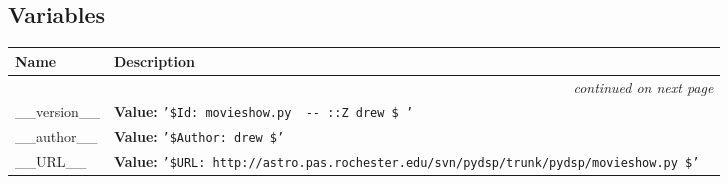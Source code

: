   \subsection{Variables}

\begin{longtable}{|p{}|p{}|l}
\cline{1-2}
\cline{1-2} \centering \textbf{Name} & \centering \textbf{Description}& \\
\cline{1-2}
\endhead\cline{1-2}\multicolumn{3}{r}{\small\textit{continued on next page}}\\\endfoot\cline{1-2}
\endlastfoot\raggedright \_\-\_\-v\-e\-r\-s\-i\-o\-n\-\_\-\_\- & \textbf{Value:} 
{\tt '\-\$\-I\-d\-:\-~\-m\-o\-v\-i\-e\-s\-h\-o\-w\-.\-p\-y\-~\-4\-0\-0\-~\-2\-0\-0\-6\--\-0\-6\--\-1\-9\-~\-2\-2\-:\-3\-9\-:\-3\-0\-Z\-~\-d\-r\-e\-w\-~\-\$\-~\-'\-}&\\
\cline{1-2}
\raggedright \_\-\_\-a\-u\-t\-h\-o\-r\-\_\-\_\- & \textbf{Value:} 
{\tt '\-\$\-A\-u\-t\-h\-o\-r\-:\-~\-d\-r\-e\-w\-~\-\$\-'\-}&\\
\cline{1-2}
\raggedright \_\-\_\-U\-R\-L\-\_\-\_\- & \textbf{Value:} 
{\tt '\-\$\-U\-R\-L\-:\-~\-h\-t\-t\-p\-:\-/\-/\-a\-s\-t\-r\-o\-.\-p\-a\-s\-.\-r\-o\-c\-h\-e\-s\-t\-e\-r\-.\-e\-d\-u\-/\-s\-v\-n\-/\-p\-y\-d\-s\-p\-/\-t\-r\-u\-n\-k\-/\-p\-y\-d\-s\-p\-/\-m\-o\-v\-i\-e\-s\-h\-o\-w\-.\-p\-y\-~\-\$\-'\-}&\\
\cline{1-2}
\end{longtable}

